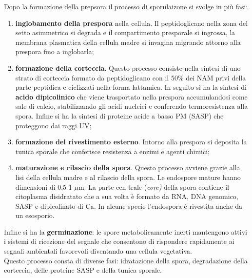 \documentclass[11pt]{book}
\begin{document}
\vspace{1em}
Dopo la formazione della prepsora il processo di sporulaizone si svolge in più fasi:
\begin{enumerate}
\item \textbf{inglobamento della prespora} nella cellula. Il peptidoglicano nella zona del setto asimmetrico si degrada e il compartimento presporale si ingrossa, la membrana plasmatica della cellula madre si invagina migrando attorno alla prespora fino a inglobarla;
\item \textbf{formazione della corteccia}. Questo processo consiste nella sintesi di uno strato di corteccia formato da peptidoglicano con il 50$\%$  dei NAM privi della parte peptidica e ciclizzati nella forma lattamica. In seguito si ha la sintesi di \textbf{acido dipicolinico} che viene trasportato nella prespora accumulandosi come sale di calcio, stabilizzando gli acidi nucleici e conferendo termoresistenza alla spora. Infine si ha la sintesi di proteine acide a basso PM (SASP) che proteggono dai raggi UV;
\item \textbf{formazione del rivestimento esterno}. Intorno alla prespora si deposita la tunica sporale che conferisce resistenza a enzimi e agenti chimici;
\item \textbf{maturazione e rilascio della spora}. Questo processo avviene grazie alla lisi della cellula madre e al rilascio della spora. Le endospore mature hanno dimensioni di 0.5-1 $\mu$m. La parte cen trale (\emph{core)} della spora contiene il citoplasma disidratato che a sua volta è formato da RNA, DNA genomico, SASP e dipicolinato di Ca. In alcune specie l’endospora è rivestita anche da un esosporio.
\end{enumerate}

\clearpage
Infine si ha la \textbf{germinazione}: le spore metabolicamente inerti mantengono attivi i sistemi di ricezione del segnale che consentono di rispondere rapidamente ai segnali ambientali favorevoli diventando una cellula vegetativa.\\
Questo processo consta di diverse fasi: idratazione della spora, degradazione della corteccia, delle proteine SASP e della tunica sporale.
\end{document}
